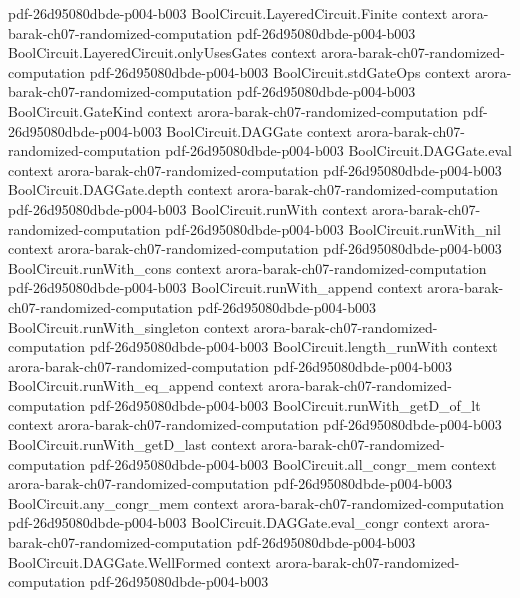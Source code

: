 \begin{theorem}
  {pdf-26d95080dbde-p004-b003}
\proofstep
  {BoolCircuit.LayeredCircuit.Finite}
  {context}
  {arora-barak-ch07-randomized-computation}
  {pdf-26d95080dbde-p004-b003}
\proofstep
  {BoolCircuit.LayeredCircuit.onlyUsesGates}
  {context}
  {arora-barak-ch07-randomized-computation}
  {pdf-26d95080dbde-p004-b003}
\proofstep
  {BoolCircuit.stdGateOps}
  {context}
  {arora-barak-ch07-randomized-computation}
  {pdf-26d95080dbde-p004-b003}
\proofstep
  {BoolCircuit.GateKind}
  {context}
  {arora-barak-ch07-randomized-computation}
  {pdf-26d95080dbde-p004-b003}
\proofstep
  {BoolCircuit.DAGGate}
  {context}
  {arora-barak-ch07-randomized-computation}
  {pdf-26d95080dbde-p004-b003}
\proofstep
  {BoolCircuit.DAGGate.eval}
  {context}
  {arora-barak-ch07-randomized-computation}
  {pdf-26d95080dbde-p004-b003}
\proofstep
  {BoolCircuit.DAGGate.depth}
  {context}
  {arora-barak-ch07-randomized-computation}
  {pdf-26d95080dbde-p004-b003}
\proofstep
  {BoolCircuit.runWith}
  {context}
  {arora-barak-ch07-randomized-computation}
  {pdf-26d95080dbde-p004-b003}
\proofstep
  {BoolCircuit.runWith_nil}
  {context}
  {arora-barak-ch07-randomized-computation}
  {pdf-26d95080dbde-p004-b003}
\proofstep
  {BoolCircuit.runWith_cons}
  {context}
  {arora-barak-ch07-randomized-computation}
  {pdf-26d95080dbde-p004-b003}
\proofstep
  {BoolCircuit.runWith_append}
  {context}
  {arora-barak-ch07-randomized-computation}
  {pdf-26d95080dbde-p004-b003}
\proofstep
  {BoolCircuit.runWith_singleton}
  {context}
  {arora-barak-ch07-randomized-computation}
  {pdf-26d95080dbde-p004-b003}
\proofstep
  {BoolCircuit.length_runWith}
  {context}
  {arora-barak-ch07-randomized-computation}
  {pdf-26d95080dbde-p004-b003}
\proofstep
  {BoolCircuit.runWith_eq_append}
  {context}
  {arora-barak-ch07-randomized-computation}
  {pdf-26d95080dbde-p004-b003}
\proofstep
  {BoolCircuit.runWith_getD_of_lt}
  {context}
  {arora-barak-ch07-randomized-computation}
  {pdf-26d95080dbde-p004-b003}
\proofstep
  {BoolCircuit.runWith_getD_last}
  {context}
  {arora-barak-ch07-randomized-computation}
  {pdf-26d95080dbde-p004-b003}
\proofstep
  {BoolCircuit.all_congr_mem}
  {context}
  {arora-barak-ch07-randomized-computation}
  {pdf-26d95080dbde-p004-b003}
\proofstep
  {BoolCircuit.any_congr_mem}
  {context}
  {arora-barak-ch07-randomized-computation}
  {pdf-26d95080dbde-p004-b003}
\proofstep
  {BoolCircuit.DAGGate.eval_congr}
  {context}
  {arora-barak-ch07-randomized-computation}
  {pdf-26d95080dbde-p004-b003}
\proofstep
  {BoolCircuit.DAGGate.WellFormed}
  {context}
  {arora-barak-ch07-randomized-computation}
  {pdf-26d95080dbde-p004-b003}

\end{theorem}
